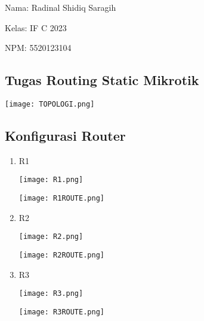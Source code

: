 \documentclass[12pt,a4paper]{article}
\date{}
\begin{document}
Nama: Radinal Shidiq Saragih

Kelas: IF C 2023

NPM: 5520123104

\begin{center}
  \section*{Tugas Routing Static Mikrotik}
  \vspace{0.5cm}

    \texttt{[image: TOPOLOGI.png]}

  \vspace{0.5cm}
\end{center}

\subsection*{Konfigurasi Router}

\begin{enumerate}
	\item R1

		\texttt{[image: R1.png]}

		\texttt{[image: R1ROUTE.png]}

	\item R2

		\texttt{[image: R2.png]}

		\texttt{[image: R2ROUTE.png]}

	\item R3

		\texttt{[image: R3.png]}

		\texttt{[image: R3ROUTE.png]}
\end{enumerate}
\end{document}
